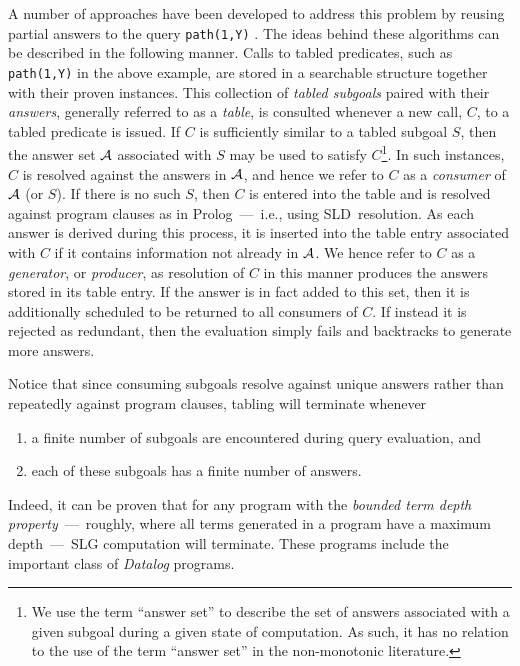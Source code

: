 A number of approaches have been developed to address this problem by
reusing partial answers to the query {\tt path(1,Y)}
\cite{Diet87,TaSa86,BMSU86,Viei89,Walk93}.  The ideas behind these
algorithms can be described in the following manner.  Calls to tabled
predicates, such as {\tt path(1,Y)} in the above example, are stored
in a searchable structure together with their proven instances.  This
collection of \emph{tabled subgoals} paired with their \emph{answers},
generally referred to as a \emph{table}, is consulted whenever a new
call, $C$, to a tabled predicate is issued.  If $C$ is sufficiently
similar to a tabled subgoal $S$, then the answer set ${\cal A}$ associated
with $S$ may be used to satisfy $C$\footnote{We use the term ``answer
set'' to describe the set of answers associated with a given subgoal
during a given state of computation.  As such, it has no relation to
the use of the term ``answer set'' in the non-monotonic literature.}\@.
In such instances, $C$ is resolved against the answers in ${\cal A}$, and
hence we refer to $C$ as a \emph{consumer} of
${\cal A}$ (or $S$)\@.  If there is no such $S$, then $C$ is entered into the
table and is resolved against program clauses as in Prolog~---~i.e.,
using SLD~resolution.  As each answer is derived during this process,
it is inserted into the table entry associated with $C$ if it contains
information not already in ${\cal A}$\@.  We hence refer to $C$ as a
\emph{generator}, or \emph{producer}, as resolution of $C$ in this manner produces the answers
stored in its table entry.  If the answer is in fact added to this
set, then it is additionally scheduled to be returned to all consumers
of $C$\@.  If instead it is rejected as redundant, then the evaluation
simply fails and backtracks to generate more answers.

Notice that since consuming subgoals resolve against unique answers
rather than repeatedly against program clauses, tabling will terminate
whenever
\begin{enumerate}
\item a finite number of subgoals are encountered during query
      evaluation, and
\item each of these subgoals has a finite number of answers.
\end{enumerate}
Indeed, it can be proven that for any program with the \emph{bounded
term depth property}~---~roughly, where all terms generated in a
program have a maximum depth~---~SLG computation will terminate.
These programs include the important class of \emph{Datalog} programs.

